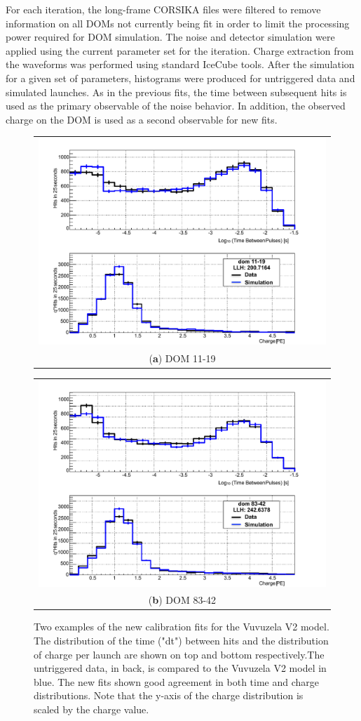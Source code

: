 For each iteration, the long-frame CORSIKA files were filtered to remove information on all DOMs not currently being fit in order to limit the processing power required for DOM simulation.
The noise and detector simulation were applied using the current parameter set for the iteration.
Charge extraction from the waveforms was performed using standard IceCube tools.
After the simulation for a given set of parameters, histograms were produced for untriggered data and simulated launches.
As in the previous fits, the time between subsequent hits is used as the primary observable of the noise behavior.
In addition, the observed charge on the DOM is used as a second observable for new fits.

\begin{figure}[h]
\centering
\begin{tabular}[b]{c}
  \includegraphics[width=0.45\linewidth]{new_dom_11-19.pdf} \\
  \small (\textbf{\color{ctcolormain}a}) DOM 11-19
\end{tabular} \hspace{2pt}
\begin{tabular}[b]{c}
  \includegraphics[width=0.45\linewidth]{new_dom_83-42.pdf} \\
  \small (\textbf{\color{ctcolormain}b}) DOM 83-42
\end{tabular}
\caption[Examples of Vuvuzela V2 noise fits]{Two examples of the new calibration fits for the Vuvuzela V2 model. The distribution of the time ("dt") between hits and the distribution of charge per launch are shown on top and bottom respectively.The untriggered data, in back, is compared to the Vuvuzela V2 model in blue. The new fits shown good agreement in both time and charge distributions. Note that the y-axis of the charge distribution is scaled by the charge value.}
\label{fig:new_vuvuzela_fits}
\end{figure}

